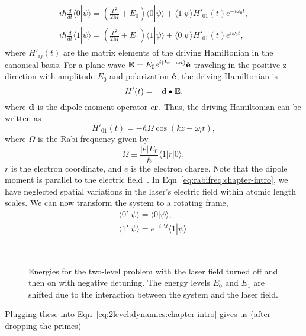 \begin{eqnarray}
i\hbar \frac{d}{dt}\langle 0|\psi\rangle = \left( \frac{P^2}{2M} + E_0 \right) \langle 0|\psi\rangle +  \langle 1|\psi\rangle H'_{01}(t) e^{-i\omega_0 t}, \nonumber\\
i\hbar \frac{d}{dt}\langle 1|\psi\rangle = \left( \frac{P^2}{2M} + E_1 \right) \langle 1|\psi\rangle + \langle 0|\psi\rangle H'_{01}(t) e^{i\omega_0 t},
\label{eq:2level:dynamics:chapter-intro}
\end{eqnarray}
where $H'_{ij}(t)$ are the matrix elements of the driving Hamiltonian in the canonical basis. For a plane wave ${\bf E} = E_0 e^{i( kz-\omega t)} \hat{{\bf e}}$ traveling in the positive z direction with amplitude $E_0$ and polarization $\hat{{\bf e}}$, the driving Hamiltonian is 
\begin{equation}
H'(t)=- {\bf d}\bullet {\bf E},
\end{equation}
where ${\bf d}$ is the dipole moment operator $e{\bf r}$. Thus, the driving Hamiltonian can be written as
\begin{equation}
H'_{01}(t)=- \hbar\Omega \cos{(kz-\omega_l t)},
\end{equation}
where $\Omega$ is the Rabi frequency given by
\begin{equation}
 \Omega \equiv \frac{|e| E_0}{\hbar}\langle 1 |  r | 0\rangle,
\label{eq:rabifreq:chapter-intro}
\end{equation}
$r$ is the electron coordinate, and $e$ is the electron charge.  Note that the dipole moment is parallel to the electric field~\cite{metcalf:vanderstraten}. In Eqn~\ref{eq:rabifreq:chapter-intro}, we have neglected spatial variations in the laser's electric field within atomic length scales. We can now transform the system to a rotating frame,
\begin{eqnarray}
\langle 0'|\psi\rangle = \langle 0|\psi\rangle, \nonumber \\
\langle 1'|\psi\rangle =  e^{-i \Delta t} \langle 1|\psi\rangle .
\end{eqnarray}
\begin{figure} 
\vspace*{-0.3in}
\ 
\caption{Energies for the two-level problem with the laser field turned off and then on with negative detuning. The energy levels $E_0$ and $E_1$ are shifted due to the interaction between the system and the laser field.}
\label{fig:dressed:states:chapter-intro}
\end{figure}
Plugging these into Eqn~\ref{eq:2level:dynamics:chapter-intro} gives us (after dropping the primes)

